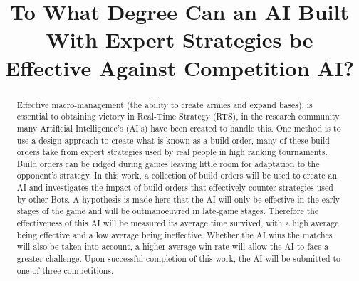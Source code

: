 \documentclass[journal]{IEEEtran}
\begin{document}
	\title{%
		To What Degree Can an AI Built With Expert Strategies be Effective Against Competition AI?} %
	
	\author{
	}
	
	
	\maketitle
	
	\begin{abstract}
		Effective macro-management (the ability to create armies and expand bases), is essential to obtaining victory in Real-Time Strategy (RTS), in the research community many Artificial Intelligence's (AI's) have been created to handle this. One method is to use a design approach to create what is known as a build order, many of these build orders take from expert strategies used by real people in high ranking tournaments. Build orders can be ridged during games leaving little room for adaptation to the opponent's strategy. In this work, a collection of build orders will be used to create an AI and investigates the impact of build orders that effectively counter strategies used by other Bots. A hypothesis is made here that the AI will only be effective in the early stages of the game and will be outmanoeuvred in late-game stages. Therefore the effectiveness of this AI will be measured its average time survived, with a high average being effective and a low average being ineffective. Whether the AI wins the matches will also be taken into account, a higher average win rate will allow the AI to face a greater challenge. Upon successful completion of this work, the AI will be submitted to one of three competitions.
	\end{abstract}
	
\end{document}
